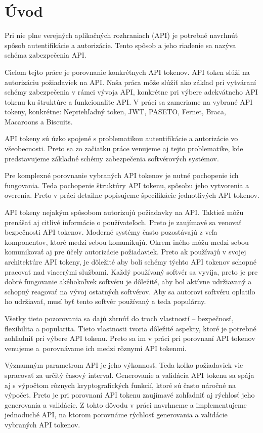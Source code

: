 \chapter*{Úvod} %

Pri nie plne verejných aplikačných rozhraniach (API) je potrebné navrhnúť spôsob autentifikácie a autorizácie. Tento spôsob a jeho riadenie sa nazýva schéma zabezpečenia API.

Cieľom tejto práce je porovnanie konkrétnych API tokenov. API token slúži na autorizáciu požiadaviek na API. Naša práca môže slúžiť ako základ pri vytváraní schémy zabezpečenia v rámci vývoja API, konkrétne pri výbere adekvátneho API tokenu ku štruktúre a funkcionalite API. V práci sa zameriame na vybrané API tokeny, konkrétne: Nepriehľadný token, JWT, PASETO, Fernet, Braca, Macaroons a Biscuits. 

API tokeny sú úzko spojené s problematikou autentifikácie a autorizácie vo všeobecnosti. Preto sa zo začiatku práce venujeme aj tejto problematike, kde predstavujeme základné schémy zabezpečenia softvérových systémov.

Pre komplexné porovnanie vybraných API tokenov je nutné pochopenie ich fungovania. Teda pochopenie štruktúry API tokenu, spôsobu jeho vytvorenia a overenia. Preto v práci detailne popisujeme špecifikácie jednotlivých API tokenov.

API tokeny nejakým spôsobom autorizujú požiadavky na API. Taktiež môžu prenášať aj citlivé informácie o používateľoch. Preto je zaujímavé sa venovať bezpečnosti API tokenov. Moderné systémy často pozostávajú z veľa komponentov, ktoré medzi sebou komunikujú. Okrem iného môžu medzi sebou komunikovať aj pre účely autorizácie požiadaviek. Preto ak používajú v svojej architektúre API tokeny, je dôležité aby boli schémy týchto API tokenov schopné pracovať nad viacerými službami. Každý používaný softvér sa vyvíja, preto je pre dobré fungovanie akéhokoľvek softvéru je dôležité, aby bol aktívne udržiavaný a schopný reagovať na vývoj ostatných softvérov. Aby sa autorovi softvéru oplatilo ho udržiavať, musí byť tento softvér používaný a teda populárny.

Všetky tieto pozorovania sa dajú zhrnúť do troch vlastností -- bezpečnosť, flexibilita a popularita. Tieto vlastnosti tvoria dôležité aspekty, ktoré je potrebné zohľadniť pri výbere API tokenu. Preto sa im v práci pri porovnaní API tokenov venujeme a~porovnávame ich medzi rôznymi API tokenmi.

Významným parametrom API je jeho výkonnosť. Teda koľko požiadaviek vie spracovať za určitý časový interval. Generovanie a validácia API tokenu sa spája aj s výpočtom rôznych kryptografických funkcií, ktoré sú často náročné na výpočet. Preto je pri porovnaní API tokenu zaujímavé zohľadniť aj rýchlosť jeho generovania a validácie. Z tohto dôvodu v práci navrhneme a implementujeme jednoduché API, na ktorom porovnáme rýchlosť generovania a validácie vybraných API tokenov.
